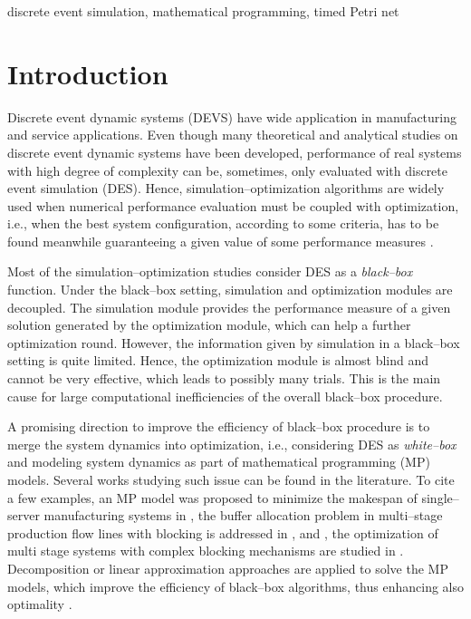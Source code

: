 \documentclass[suppldata]{interact}
\theoremstyle{plain}
\theoremstyle{definition}
\theoremstyle{remark}
\begin{document}
\begin{keywords}
discrete event simulation, mathematical programming, timed Petri net
\end{keywords}


\section{Introduction}

Discrete event dynamic systems (DEVS) have wide application in manufacturing and service applications. Even though many theoretical and analytical studies on discrete event dynamic systems have been developed, performance of real systems with high degree of complexity can be, sometimes, only evaluated with discrete event simulation (DES). Hence, simulation--optimization algorithms are widely used when numerical performance evaluation must be coupled with optimization, i.e., when the best system configuration, according to some criteria, has to be found meanwhile guaranteeing a given value of some performance measures \citep{fu20115book}.  

Most of the simulation--optimization studies consider DES as a \textit{black--box} function. Under the black--box setting, simulation and optimization modules are %
decoupled. The simulation module provides the performance measure of a given solution generated by the optimization module, which can help a further optimization round. However, the information given by simulation in a black--box setting is quite limited. Hence, the optimization module is almost blind and cannot be very effective, which leads to possibly many trials. This is the main cause for large computational inefficiencies of the overall black--box procedure.

A promising direction to improve the %
efficiency of black--box procedure is to merge the system dynamics into optimization, i.e., considering DES as \textit{white--box} and modeling system dynamics as part of mathematical programming (MP) models. Several works studying such issue can be found in the literature. To cite a few examples, an MP model was proposed to minimize the makespan of single--server manufacturing systems in \citep{di2020makespan}, the buffer allocation problem in multi--stage production flow lines with blocking is addressed in \citep{matta2008simulation}, \citep{weiss2015buffer} and \citep{alfieri2020time}, the optimization of multi stage systems with complex blocking mechanisms are studied in \citep{pedrielli2015integrated}. Decomposition or linear approximation approaches are applied to solve the MP models, %
which improve the efficiency of black--box algorithms, thus enhancing also optimality \citep{weiss2015buffer}\citep{alfieri2020time}. 
\end{document}
